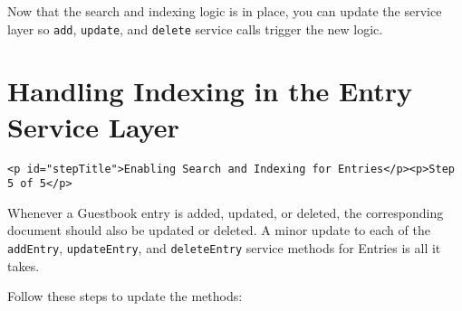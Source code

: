 Now that the search and indexing logic is in place, you can update the
service layer so \texttt{add}, \texttt{update}, and \texttt{delete}
service calls trigger the new logic.

\chapter{Handling Indexing in the Entry Service
Layer}\label{handling-indexing-in-the-entry-service-layer}

\begin{verbatim}
<p id="stepTitle">Enabling Search and Indexing for Entries</p><p>Step 5 of 5</p>
\end{verbatim}

Whenever a Guestbook entry is added, updated, or deleted, the
corresponding document should also be updated or deleted. A minor update
to each of the \texttt{addEntry}, \texttt{updateEntry}, and
\texttt{deleteEntry} service methods for Entries is all it takes.

Follow these steps to update the methods:

